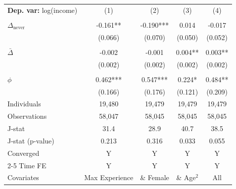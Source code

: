 \begin{tabular}{l cccc} \toprule  \textbf{Dep. var:}  log(income) 
                    &\multicolumn{1}{c}{(1)}   &\multicolumn{1}{c}{(2)}   &\multicolumn{1}{c}{(3)}   &\multicolumn{1}{c}{(4)}   \\
                    &               &               &               &               \\
\addlinespace
$\Delta_{\text{never}}$&      -0.161** &      -0.190***&       0.014   &      -0.017   \\
                    &     (0.066)   &     (0.070)   &     (0.050)   &     (0.052)   \\
                    &               &               &               &               \\
\addlinespace
$\bar{\Delta}$      &      -0.002   &      -0.001   &       0.004** &       0.003** \\
                    &     (0.002)   &     (0.002)   &     (0.002)   &     (0.002)   \\
                    &               &               &               &               \\
\addlinespace
$\phi$              &       0.462***&       0.547***&       0.224*  &       0.484** \\
                    &     (0.166)   &     (0.176)   &     (0.121)   &     (0.209)   \\
\addlinespace
Individuals         &      19,480   &      19,479   &      19,479   &      19,479   \\
Observations        &      58,047   &      58,045   &      58,045   &      58,045   \\
J-stat              &        31.4   &        28.9   &        40.7   &        38.5   \\
J-stat (p-value)    &       0.213   &       0.316   &       0.033   &       0.055   \\
Converged           &           Y   &           Y   &           Y   &           Y   \\
\cmidrule{2-5} Time FE & Y & Y & Y & Y \\ Covariates & Max Experience & \& Female & \& Age$^2$ & All \\ \bottomrule \end{tabular}
